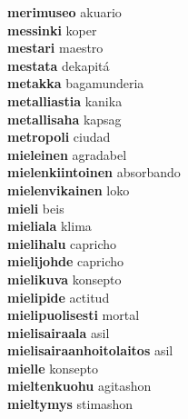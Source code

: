 \textbf{merimuseo } akuario \\
\textbf{messinki } koper \\
\textbf{mestari } maestro \\
\textbf{mestata } dekapitá \\
\textbf{metakka } bagamunderia \\
\textbf{metalliastia } kanika \\
\textbf{metallisaha } kapsag \\
\textbf{metropoli } ciudad \\
\textbf{mieleinen } agradabel \\
\textbf{mielenkiintoinen } absorbando \\
\textbf{mielenvikainen } loko \\
\textbf{mieli } beis \\
\textbf{mieliala } klima \\
\textbf{mielihalu } capricho \\
\textbf{mielijohde } capricho \\
\textbf{mielikuva } konsepto \\
\textbf{mielipide } actitud \\
\textbf{mielipuolisesti } mortal \\
\textbf{mielisairaala } asil \\
\textbf{mielisairaanhoitolaitos } asil \\
\textbf{mielle } konsepto \\
\textbf{mieltenkuohu } agitashon \\
\textbf{mieltymys } stimashon \\
